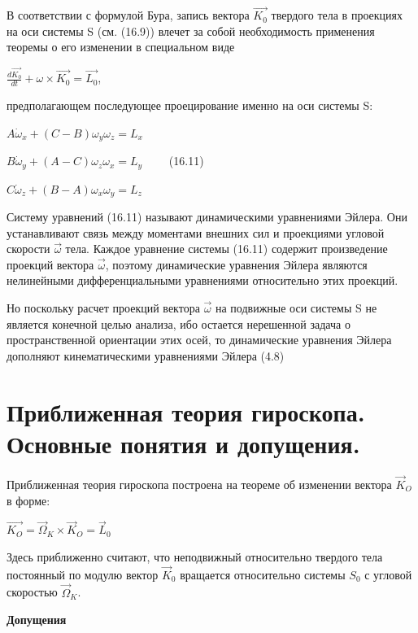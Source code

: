 {\begin{center}
    \par В соответствии с формулой Бура, запись вектора  $\vec{K_0}$ твердого тела в проекциях на оси системы S (см. (16.9)) влечет за собой необходимость применения теоремы о его изменении в специальном виде
    \par $\frac{ d\vec{K_0}}{dt} + \omega \times \vec{K_0} = \vec{L_0}$,
    \par предполагающем последующее проецирование именно на оси системы S:
    \par $A \dot{\omega}_x + (C-B) \omega_y \omega_z = L_x$
    \par $B \dot{\omega}_y + (A-C) \omega_z \omega_x = L_y \qquad $ (16.11)
    \par $C \dot{\omega}_z + (B-A) \omega_x \omega_y = L_z$
    \par Систему уравнений (16.11) называют динамическими уравнениями Эйлера. Они устанавливают связь между моментами внешних сил и проекциями угловой скорости $\vec{\omega}$ тела. Каждое уравнение системы (16.11) содержит произведение проекций вектора $\vec{\omega}$, поэтому динамические уравнения Эйлера являются нелинейными дифференциальными уравнениями относительно этих проекций.
    \par Но поскольку расчет проекций вектора $\vec{\omega}$  на подвижные оси системы S не является конечной целью анализа, ибо остается нерешенной задача о пространственной ориентации этих осей, то динамические уравнения Эйлера дополняют кинематическими уравнениями  Эйлера  (4.8)
    \par 
\end{center}
\section{Приближенная теория гироскопа. Основные понятия и допущения.}
\begin{center}
    \par Приближенная теория гироскопа построена на теореме об изменении вектора $\vec{K}_{O}$ в форме:

    \par $   \vec{K_{O}} = \vec{\Omega}_{K} \times \vec{K}_{O} = \vec{L}_{0} $

    \par Здесь приближенно считают, что неподвижный относительно твердого тела постоянный  по  модулю  вектор $\vec{K}_{0} $  вращается  относительно  системы $S_{0}$  с угловой скоростью $\Vec{\Omega}_{K}$.

    \par \textbf{Допущения}


\end{center}}
